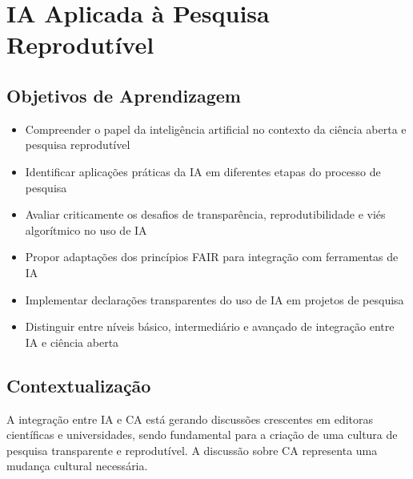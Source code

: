 \documentclass[
  a4paper,
]{book}
\providecommand{\tightlist}{%
  \setlength{\itemsep}{0pt}\setlength{\parskip}{0pt}}\usepackage{longtable,booktabs,array}
\newcommand{\emojitext}[1]{{\emoji #1}}
\begin{document}

\chapter{IA Aplicada à Pesquisa Reprodutível}\label{sec-AI}

\section{Objetivos de Aprendizagem}\label{objetivos-de-aprendizagem-7}

\begin{tcolorbox}[enhanced jigsaw, colback=white, toptitle=1mm, opacityback=0, left=2mm, rightrule=.15mm, title={\emojitext{🎯} Ao final deste módulo, você será capaz de:}, coltitle=black, opacitybacktitle=0.6, breakable, toprule=.15mm, bottomtitle=1mm, titlerule=0mm, bottomrule=.15mm, arc=.35mm, leftrule=.75mm, colframe=quarto-callout-tip-color-frame, colbacktitle=quarto-callout-tip-color!10!white]

\begin{itemize}
\tightlist
\item
  Compreender o papel da inteligência artificial no contexto da ciência
  aberta e pesquisa reprodutível
\item
  Identificar aplicações práticas da IA em diferentes etapas do processo
  de pesquisa
\item
  Avaliar criticamente os desafios de transparência, reprodutibilidade e
  viés algorítmico no uso de IA
\item
  Propor adaptações dos princípios FAIR para integração com ferramentas
  de IA
\item
  Implementar declarações transparentes do uso de IA em projetos de
  pesquisa
\item
  Distinguir entre níveis básico, intermediário e avançado de integração
  entre IA e ciência aberta
\end{itemize}

\end{tcolorbox}

\section{Contextualização}\label{contextualizauxe7uxe3o-7}

A integração entre IA e CA está gerando discussões crescentes em
editoras científicas e universidades, sendo fundamental para a criação
de uma cultura de pesquisa transparente e reprodutível. A discussão
sobre CA representa uma mudança cultural necessária.
\end{document}
